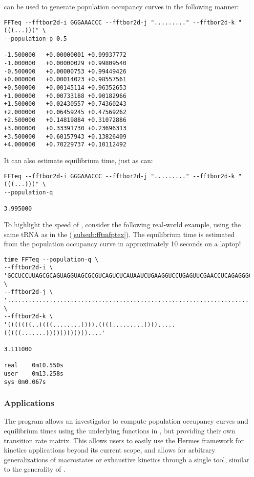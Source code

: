 \documentclass[11pt]{article}
\begin{document}
\ffteq can be used to generate population occupancy curves in the following manner:

\begin{verbatim}
FFTeq --fftbor2d-i GGGAAACCC --fftbor2d-j "........." --fftbor2d-k "(((...)))" \
--population-p 0.5

-1.500000	+0.00000001	+0.99937772
-1.000000	+0.00000029	+0.99809540
-0.500000	+0.00000753	+0.99449426
+0.000000	+0.00014023	+0.98557561
+0.500000	+0.00145114	+0.96352653
+1.000000	+0.00733188	+0.90182966
+1.500000	+0.02430557	+0.74360243
+2.000000	+0.06459245	+0.47569262
+2.500000	+0.14819884	+0.31072886
+3.000000	+0.33391730	+0.23696313
+3.500000	+0.60157943	+0.13826409
+4.000000	+0.70229737	+0.10112492
\end{verbatim}

It can also estimate equilibrium time, just as \rnaeq can:

\begin{verbatim}
FFTeq --fftbor2d-i GGGAAACCC --fftbor2d-j "........." --fftbor2d-k "(((...)))" \
--population-q

3.995000
\end{verbatim}

To highlight the speed of \ffteq, consider the following real-world example, using the same tRNA as in the \fftmfpt (\ref{subsub:fftmfptex}). The equilibrium time is estimated from the population occupancy curve in approximately 10 seconds on a laptop!

\begin{verbatim}
time FFTeq --population-q \
--fftbor2d-i \
'GCCUCCUUAGCGCAGUAGGUAGCGCGUCAGUCUCAUAAUCUGAAGGUCCUGAGUUCGAACCUCAGAGGGGGCACCA' \
--fftbor2d-j \
'............................................................................' \
--fftbor2d-k \
'(((((((..((((........)))).((((.........)))).....(((((.......))))))))))))....'

3.111000

real	0m10.550s
user	0m13.258s
sys	0m0.067s
\end{verbatim}


\subsubsection{Applications} \label{subsub:rateeqapp}

The program \rateeq allows an investigator to compute population occupancy curves and equilibrium times using the underlying functions in \rnaeq, but providing their own transition rate matrix. This allows users to easily use the Hermes framework for kinetics applications beyond its current scope, and allows for arbitrary generalizations of macrostates or exhaustive kinetics through a single tool, similar to the generality of \rnamfpt.
\end{document}
